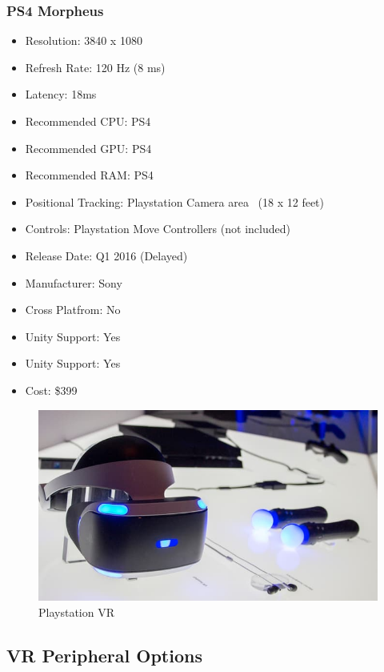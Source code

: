 \documentclass[a4paper,10pt]{article}
\begin{document}
\subsubsection{PS4 Morpheus}
\begin{itemize}
  \item Resolution: 3840 x 1080 
  \item Refresh Rate: 120 Hz (8 ms)
  \item Latency: 18ms
  \item Recommended CPU: PS4
  \item Recommended GPU: PS4
  \item Recommended RAM: PS4
  \item Positional Tracking: Playstation Camera area ~(18 x 12 feet)
  \item Controls: Playstation Move Controllers (not included)
  \item Release Date: Q1 2016 (Delayed)
  \item Manufacturer: Sony
  \item Cross Platfrom: No
    \item Unity Support: Yes
  \item Unity Support: Yes
  \item Cost: \$399
\end{itemize}
\begin{figure}[H]
	\includegraphics[width=\linewidth,height=\paperheight,keepaspectratio]{morpheus.jpg}
	\caption{Playstation VR}
	\label{fig:psvrImg}
\end{figure}
	\pagebreak
	
\pagebreak
\subsection{VR Peripheral Options}
\label{section:peripheral}
\end{document}
